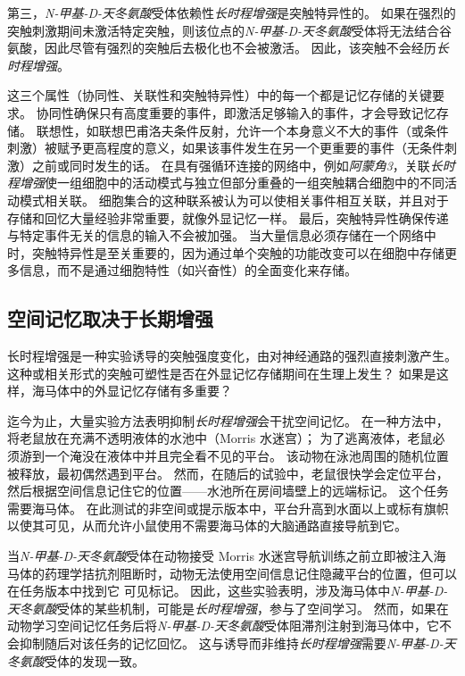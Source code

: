 第三，\textit{N-甲基-D-天冬氨酸}受体依赖性\textit{长时程增强}是突触特异性的。
如果在强烈的突触刺激期间未激活特定突触，则该位点的\textit{N-甲基-D-天冬氨酸}受体将无法结合谷氨酸，因此尽管有强烈的突触后去极化也不会被激活。
因此，该突触不会经历\textit{长时程增强}。


这三个属性（协同性、关联性和突触特异性）中的每一个都是记忆存储的关键要求。
协同性确保只有高度重要的事件，即激活足够输入的事件，才会导致记忆存储。
联想性，如联想巴甫洛夫条件反射，允许一个本身意义不大的事件（或条件刺激）被赋予更高程度的意义，如果该事件发生在另一个更重要的事件（无条件刺激）之前或同时发生的话。
在具有强循环连接的网络中，例如\textit{阿蒙角3}，关联\textit{长时程增强}使一组细胞中的活动模式与独立但部分重叠的一组突触耦合细胞中的不同活动模式相关联。
细胞集合的这种联系被认为可以使相关事件相互关联，并且对于存储和回忆大量经验非常重要，就像外显记忆一样。
最后，突触特异性确保传递与特定事件无关的信息的输入不会被加强。
当大量信息必须存储在一个网络中时，突触特异性是至关重要的，因为通过单个突触的功能改变可以在细胞中存储更多信息，而不是通过细胞特性（如兴奋性）的全面变化来存储。



\subsection{空间记忆取决于长期增强}

长时程增强是一种实验诱导的突触强度变化，由对神经通路的强烈直接刺激产生。
这种或相关形式的突触可塑性是否在外显记忆存储期间在生理上发生？
如果是这样，海马体中的外显记忆存储有多重要？


迄今为止，大量实验方法表明抑制\textit{长时程增强}会干扰空间记忆。
在一种方法中，将老鼠放在充满不透明液体的水池中（Morris 水迷宫）；
为了逃离液体，老鼠必须游到一个淹没在液体中并且完全看不见的平台。
该动物在泳池周围的随机位置被释放，最初偶然遇到平台。
然而，在随后的试验中，老鼠很快学会定位平台，然后根据空间信息记住它的位置——水池所在房间墙壁上的远端标记。
这个任务需要海马体。
在此测试的非空间或提示版本中，平台升高到水面以上或标有旗帜以使其可见，从而允许小鼠使用不需要海马体的大脑通路直接导航到它。


当\textit{N-甲基-D-天冬氨酸}受体在动物接受 Morris 水迷宫导航训练之前立即被注入海马体的药理学拮抗剂阻断时，动物无法使用空间信息记住隐藏平台的位置，但可以在任务版本中找到它 可见标记。
因此，这些实验表明，涉及海马体中\textit{N-甲基-D-天冬氨酸}受体的某些机制，可能是\textit{长时程增强}，参与了空间学习。
然而，如果在动物学习空间记忆任务后将\textit{N-甲基-D-天冬氨酸}受体阻滞剂注射到海马体中，它不会抑制随后对该任务的记忆回忆。
这与诱导而非维持\textit{长时程增强}需要\textit{N-甲基-D-天冬氨酸}受体的发现一致。



